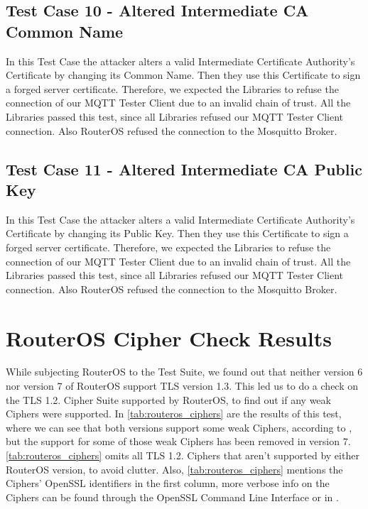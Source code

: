 \documentclass[binding=0.6cm,noexaminfo]{sapthesis}
\begin{document}
\subsection{Test Case 10 - Altered Intermediate CA Common Name}
In this Test Case the attacker alters a valid Intermediate Certificate Authority's Certificate by changing its Common Name. Then they use this Certificate to sign a forged server certificate. Therefore, we expected the Libraries to refuse the connection of our MQTT Tester Client due to an invalid chain of trust. All the Libraries passed this test, since all Libraries refused our MQTT Tester Client connection.
Also RouterOS refused the connection to the Mosquitto Broker.

\subsection{Test Case 11 - Altered Intermediate CA Public Key}
In this Test Case the attacker alters a valid Intermediate Certificate Authority's Certificate by changing its Public Key. Then they use this Certificate to sign a forged server certificate. Therefore, we expected the Libraries to refuse the connection of our MQTT Tester Client due to an invalid chain of trust. All the Libraries passed this test, since all Libraries refused our MQTT Tester Client connection.
Also RouterOS refused the connection to the Mosquitto Broker.

\section{RouterOS Cipher Check Results}\label{sec:routeros_ciphers}
While subjecting RouterOS to the Test Suite, we found out that neither version 6 nor version 7 of RouterOS support TLS version 1.3. This led us to do a check on the TLS 1.2. Cipher Suite supported by RouterOS, to find out if any weak Ciphers were supported. In \autoref{tab:routeros_ciphers} are the results of this test, where we can see that both versions support some weak Ciphers, according to \cite{ciphersuiteinfo}, but the support for some of those weak Ciphers has been removed in version 7. \autoref{tab:routeros_ciphers} omits all TLS 1.2. Ciphers that aren't supported by either RouterOS version, to avoid clutter. Also, \autoref{tab:routeros_ciphers} mentions the Ciphers' OpenSSL identifiers in the first column, more verbose info on the Ciphers can be found through the OpenSSL Command Line Interface or in \cite{ciphersuiteinfo}.
\end{document}
